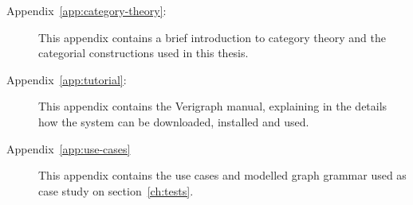 \begin{description}
  \item[Appendix~\ref{app:category-theory}:] This appendix contains a brief introduction to category theory and the categorial constructions used in this thesis.

  \item[Appendix~\ref{app:tutorial}:] This appendix contains the Verigraph manual, explaining in the details how the system can be downloaded, installed and used.

  \item[Appendix~\ref{app:use-cases}] This appendix contains the use cases and modelled graph grammar used as case study on section~\ref{ch:tests}.
\end{description}

